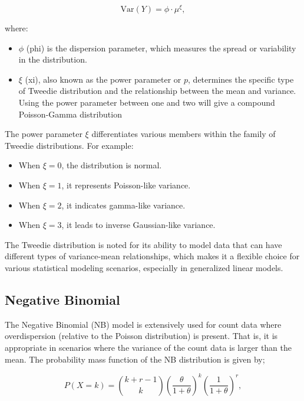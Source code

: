 \documentclass[12pt, twoside,hidelinks]{article}
\theoremstyle{definition}
\numberwithin{equation}{section}
\begin{document}
\begin{equation}
    \text{Var}(Y) = \phi \cdot \mu^\xi,
\end{equation}

where:
\begin{itemize}
    \item \( \phi \) (phi) is the dispersion parameter, which measures the spread or variability in the distribution.
    \item \( \xi \) (xi), also known as the power parameter or \( p \), determines the specific type of Tweedie distribution and the relationship between the mean and variance. Using the power parameter between one and two will give a compound Poisson-Gamma distribution
\end{itemize}

The power parameter \( \xi \) differentiates various members within the family of Tweedie distributions. For example:
\begin{itemize}
    \item When \( \xi = 0 \), the distribution is normal.
    \item When \( \xi = 1 \), it represents Poisson-like variance.
    \item When \( \xi = 2 \), it indicates gamma-like variance.
    \item When \( \xi = 3 \), it leads to inverse Gaussian-like variance.
\end{itemize}

The Tweedie distribution is noted for its ability to model data that can have different types of variance-mean relationships, which makes it a flexible choice for various statistical modeling scenarios, especially in generalized linear models.

\subsection{Negative Binomial}

The Negative Binomial (NB) model is extensively used for count data where overdispersion (relative to the Poisson distribution) is present. That is, it is appropriate in scenarios where the variance of the count data is larger than the mean. The probability mass function of the NB distribution is given by;

\begin{equation}
    P(X = k) = \binom{k+r-1}{k} \left( \frac{\theta}{1+\theta} \right)^k \left( \frac{1}{1+\theta} \right)^r,
\end{equation}
\end{document}

